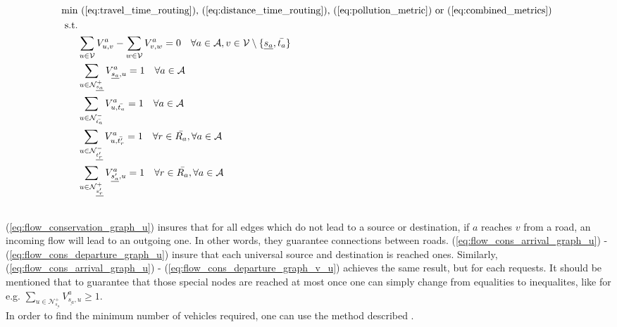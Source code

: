 \begin{align}
	\text{min}&  \text{
	(\ref{eq:travel_time_routing}), (\ref{eq:distance_time_routing}), (\ref{eq:pollution_metric}) or (\ref{eq:combined_metrics})
	}\nonumber\\
	\text{s.t.} &\nonumber\\
&\sum_{u \in \mathcal{V}} V^a_{u, v} - \sum_{w \in \mathcal{V}} V^a_{v, w} = 0 \quad \forall a \in \mathcal{A}, v \in \mathcal{V} \setminus \{\underline{s_a}, \bar{t_a}\} \label{eq:flow_conservation_graph_u} \\
&\sum_{ u \in \mathcal{N}^+_{\underline{s_a}} }V^a_{ \underline{s_a},u} = 1 \quad \forall a \in \mathcal{A} \label{eq:flow_cons_arrival_graph_u}\\
&\sum_{u \in \mathcal{N}^-_{\bar{t_a}} } V^a_{u, \bar{t_a}} = 1 \quad \forall a \in \mathcal{A} \label{eq:flow_cons_departure_graph_u}\\
&\sum_{u \in \mathcal{N}^-_{\underline{t'_r}} } V^a_{u, \bar{t'_r}} = 1 \quad \forall r \in \bar{R_a}, \forall a \in \mathcal{A} 	\label{eq:flow_cons_arrival_graph_v_u}\\
&\sum_{u \in \mathcal{N}^+_{\underline{s'_r}} } V^a_{ \underline{s'_a},u} = 1 \quad \forall r \in \bar{R_a}, \forall a \in \mathcal{A}\label{eq:flow_cons_departure_graph_v_u} \\
	\nonumber%
\end{align}
(\ref{eq:flow_conservation_graph_u}) insures that for all edges which do not lead to a source or destination, if $a$ reaches $v$ from a road, an incoming flow will lead to an outgoing one. In other words, they guarantee connections between roads. (\ref{eq:flow_cons_arrival_graph_u}) -  (\ref{eq:flow_cons_departure_graph_u}) insure that each universal source and destination is reached ones. Similarly, (\ref{eq:flow_cons_arrival_graph_u}) -  (\ref{eq:flow_cons_departure_graph_v_u}) achieves the same result, but for each requests.  It should be mentioned that to guarantee that those special nodes are reached at most once one can simply change from equalities to inequalites, like for e.g. $\sum_{ u \in \mathcal{N}^+_{\underline{s_a}} }V^a_{ \underline{s_a},u} \ge 1$.\\
In order to find the minimum number of vehicles required, one can use the method described . 
